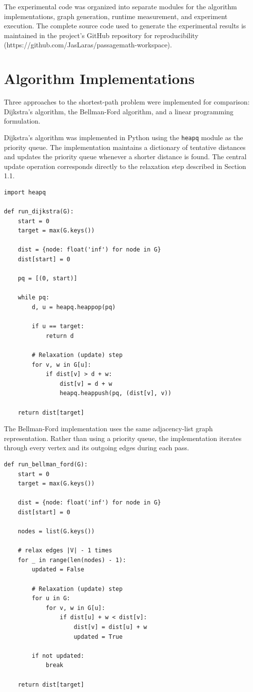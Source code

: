\documentclass[12pt]{report}
\begin{document}
The experimental code was organized into separate modules for the algorithm implementations, graph generation, runtime measurement, and experiment execution. The complete source code used to generate the experimental results is maintained in the project's GitHub repository for reproducibility (https://github.com/JasLaras/passagemath-workspace).

\section{Algorithm Implementations}

Three approaches to the shortest-path problem were implemented for comparison: Dijkstra's algorithm, the Bellman-Ford algorithm, and a linear programming formulation.

Dijkstra's algorithm was implemented in Python using the \texttt{heapq} module as the priority queue. The implementation maintains a dictionary of tentative distances and updates the priority queue whenever a shorter distance is found. The central update operation corresponds directly to the relaxation step described in Section 1.1.

\begin{verbatim}
import heapq

def run_dijkstra(G):
    start = 0
    target = max(G.keys())

    dist = {node: float('inf') for node in G}
    dist[start] = 0

    pq = [(0, start)]

    while pq:
        d, u = heapq.heappop(pq)

        if u == target:
            return d

        # Relaxation (update) step
        for v, w in G[u]:
            if dist[v] > d + w:
                dist[v] = d + w
                heapq.heappush(pq, (dist[v], v))

    return dist[target]
\end{verbatim}

The Bellman-Ford implementation uses the same adjacency-list graph representation. Rather than using a priority queue, the implementation iterates through every vertex and its outgoing edges during each pass. 

\begin{verbatim}
def run_bellman_ford(G):
    start = 0
    target = max(G.keys())

    dist = {node: float('inf') for node in G}
    dist[start] = 0

    nodes = list(G.keys())

    # relax edges |V| - 1 times
    for _ in range(len(nodes) - 1):
        updated = False

        # Relaxation (update) step
        for u in G:
            for v, w in G[u]:
                if dist[u] + w < dist[v]:
                    dist[v] = dist[u] + w
                    updated = True

        if not updated:
            break

    return dist[target]
\end{verbatim}
\end{document}
